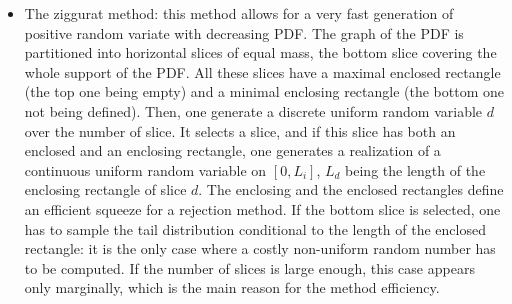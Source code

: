 {\begin{itemize}
  \item The ziggurat method: this method allows for a very fast generation of positive random variate with decreasing PDF. The graph of the PDF is partitioned into horizontal slices of equal mass, the bottom slice covering the whole support of the PDF. All these slices have a maximal enclosed rectangle (the top one being empty) and a minimal enclosing rectangle (the bottom one not being defined). Then, one generate a discrete uniform random variable $d$ over the number of slice. It selects a slice, and if this slice has both an enclosed and an enclosing rectangle, one generates a realization of a continuous uniform random variable on $[0,L_i]$, $L_d$ being the length of the enclosing rectangle of slice $d$. The enclosing and the enclosed rectangles define an efficient squeeze for a rejection method. If the bottom slice is selected, one has to sample the tail distribution conditional to the length of the enclosed rectangle: it is the only case where a costly non-uniform random number has to be computed. If the number of slices is large enough, this case appears only marginally, which is the main reason for the method efficiency.
  \end{itemize}

}
